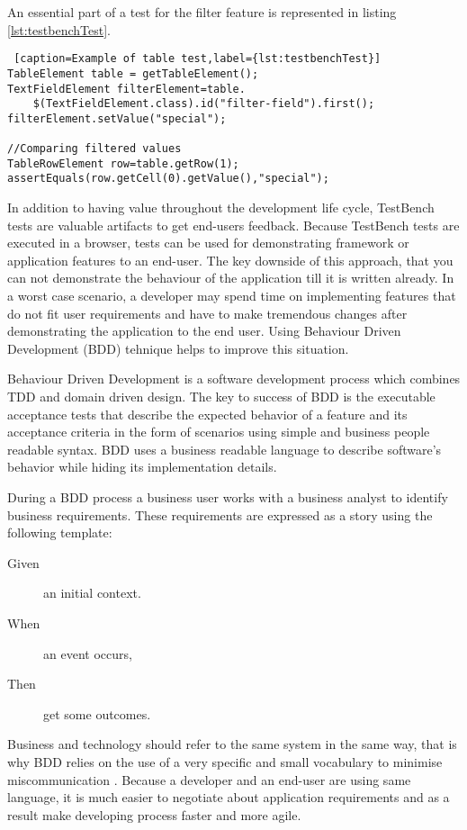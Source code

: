 An essential  part of a test for the filter feature is represented in listing
\ref{lst:testbenchTest}. 

 \lstset{style=a1listing}
  \begin{lstlisting} [caption=Example of table test,label={lst:testbenchTest}]
TableElement table = getTableElement();
TextFieldElement filterElement=table.
	$(TextFieldElement.class).id("filter-field").first();
filterElement.setValue("special");

//Comparing filtered values
TableRowElement row=table.getRow(1);
assertEquals(row.getCell(0).getValue(),"special");
  \end{lstlisting}

In addition to having value throughout the development life cycle,
TestBench tests are valuable artifacts to get end-users feedback.
Because TestBench tests are executed in a browser, tests can be used 
for demonstrating framework or application features to an end-user. The key
downside of this approach, that you can not demonstrate the behaviour of the
application till it is written already. In a worst case scenario, a developer
may spend time on implementing features that do not fit user requirements and
have to make tremendous changes after demonstrating the application to the end
user. Using Behaviour Driven Development (BDD) tehnique helps to improve this
situation.

Behaviour Driven Development is a software development process which combines
TDD and domain driven design. The key to success of BDD is the executable
acceptance tests that describe the expected behavior of a feature and its
acceptance criteria in the form of scenarios using simple and
business people readable syntax\cite{bddArticle}. BDD uses a business readable
language to describe software's behavior while hiding its implementation
details.

During a BDD process a business user works with a business analyst
to identify business requirements. These requirements are expressed as a story
using the following template:

\begin{description}
  \item[Given] an initial context.
  \item[When] an event occurs,
  \item[Then] get some outcomes. 
\end{description}

Business and technology should refer to the same system in the same way, that is
why BDD relies on the use of a very specific and small vocabulary to minimise miscommunication \cite{bddWebSite}.
Because a developer and an end-user are using same language, it is much easier
to negotiate about application requirements and as a result make developing
process faster and more agile.

